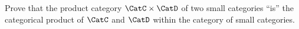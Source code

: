 \begin{gradedexercise}
    Prove that the product category $\CatC \times \CatD$ of two small categories ``is'' the categorical product of $\CatC$ and $\CatD$ within the category of small categories.
\end{gradedexercise}


